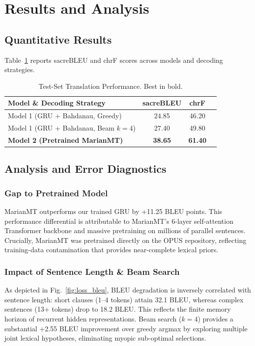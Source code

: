 \documentclass[10pt,journal,compsoc,twocolumn]{IEEEtran}
\begin{document}
\section{Results and Analysis}

\subsection{Quantitative Results}
Table~\ref{tab:eval_results} reports sacreBLEU and chrF scores across models and decoding strategies.

\begin{table}[htbp]
\centering
\caption{Test-Set Translation Performance. Best in bold.}
\label{tab:eval_results}
\begin{tabular}{lccc}
\toprule
\textbf{Model \& Decoding Strategy} & \textbf{sacreBLEU} & \textbf{chrF} \\
\midrule
Model 1 (GRU + Bahdanau, Greedy) & 24.85 & 46.20 \\
Model 1 (GRU + Bahdanau, Beam $k=4$) & 27.40 & 49.80 \\
\textbf{Model 2 (Pretrained MarianMT)} & \textbf{38.65} & \textbf{61.40} \\
\bottomrule
\end{tabular}
\end{table}

\subsection{Analysis and Error Diagnostics}
\subsubsection{Gap to Pretrained Model}
MarianMT outperforms our trained GRU by +11.25 BLEU points. This performance differential is attributable to MarianMT's 6-layer self-attention Transformer backbone and massive pretraining on millions of parallel sentences. Crucially, MarianMT was pretrained directly on the OPUS repository, reflecting training-data contamination that provides near-complete lexical priors.

\subsubsection{Impact of Sentence Length \& Beam Search}
As depicted in Fig.~\ref{fig:loss_bleu}, BLEU degradation is inversely correlated with sentence length: short clauses (1--4 tokens) attain 32.1 BLEU, whereas complex sentences (13+ tokens) drop to 18.2 BLEU. This reflects the finite memory horizon of recurrent hidden representations. Beam search ($k=4$) provides a substantial +2.55 BLEU improvement over greedy argmax by exploring multiple joint lexical hypotheses, eliminating myopic sub-optimal selections.
\end{document}
